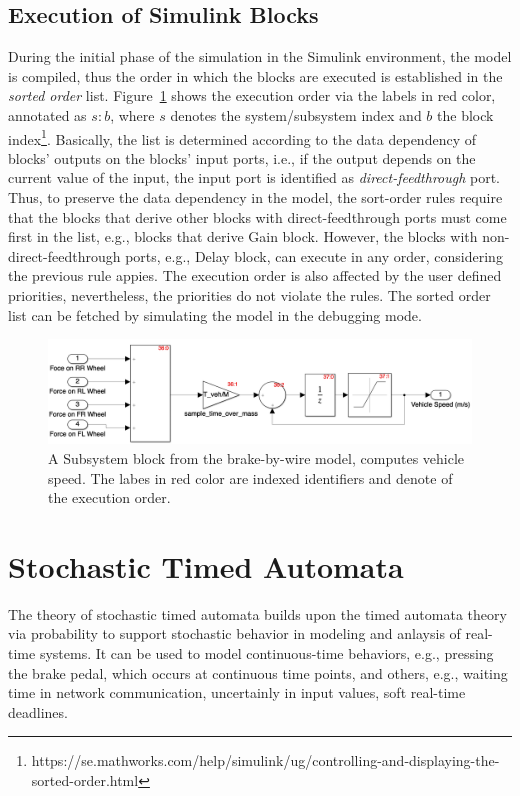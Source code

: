 \subsection*{Execution of Simulink Blocks}
During the initial phase of the simulation in the Simulink environment, the model is compiled, thus the order in which the blocks are executed is established in the \textit{sorted order} list. Figure~\ref{fig_sm_exec_order} shows the execution order via the labels in red color, annotated as $s:b$, where $s$ denotes the system/subsystem index and $b$ the block index\footnote{https://se.mathworks.com/help/simulink/ug/controlling-and-displaying-the-sorted-order.html}. Basically, the list is determined according to the data dependency of blocks' outputs on the blocks' input ports, i.e., if the output depends on the current value of the input, the input port is identified as \textit{direct-feedthrough} port. Thus, to preserve the data dependency in the model, the sort-order rules require that the blocks that derive other blocks with direct-feedthrough ports must come first in the list, e.g., blocks that derive Gain block. However, the blocks with non-direct-feedthrough ports, e.g., Delay block, can execute in any order, considering the previous rule appies. The execution order is also affected by the user defined priorities, nevertheless, the priorities do not violate the rules. The sorted order list can be fetched by simulating the model in the debugging mode.
\begin{figure}
	\centering
	\includegraphics[width=1\linewidth]{images/sm_exec_order}
	\caption{A Subsystem block from the brake-by-wire model, computes vehicle speed. The labes in red color are indexed identifiers and denote of the execution order.}
	\label{fig_sm_exec_order}
\end{figure}

\section{Stochastic Timed Automata}
The theory of stochastic timed automata builds upon the timed automata theory via probability to support stochastic behavior in modeling and anlaysis of real-time systems. It can be used to model continuous-time behaviors, e.g., pressing the brake pedal, which occurs at continuous time points, and others, e.g., waiting time in network communication, uncertainly in input values, soft real-time deadlines. 

